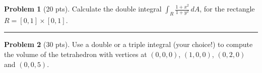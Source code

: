 \documentclass[12pt]{article}
\theoremstyle{definition}
\newtheorem{problem}{Problem}
\begin{document}
\bigskip
\begin{problem}[20 pts]
Calculate the double integral $\displaystyle{\int_R \frac{1+x^2}{1+y^2}}\, dA$, for the rectangle
$R=[0,1]\times[0,1]$.
\vspace{2cm}
\begin{flushright}
\end{flushright}
\end{problem}
\hrule
\begin{problem}[30 pts] 
Use a double or a triple integral (your choice!) to compute the volume of the tetrahedron with vertices at $(0,0,0)$, $(1,0,0)$, $(0,2,0)$ and $(0,0,5)$.
\vspace{14cm}
\begin{flushright}
\end{flushright}
\end{problem}
\end{document}
